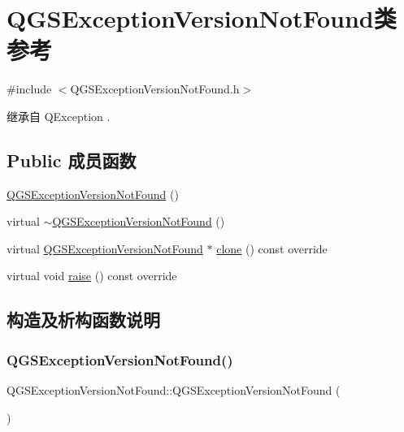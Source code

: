 \hypertarget{class_q_g_s_exception_version_not_found}{}\section{Q\+G\+S\+Exception\+Version\+Not\+Found类 参考}
\label{class_q_g_s_exception_version_not_found}


{\ttfamily \#include $<$Q\+G\+S\+Exception\+Version\+Not\+Found.\+h$>$}



继承自 Q\+Exception .

\subsection*{Public 成员函数}
\begin{DoxyCompactItemize}
\item 
\mbox{\hyperlink{class_q_g_s_exception_version_not_found_a5211acf581c02f697b3f5be156aa3dd7}{Q\+G\+S\+Exception\+Version\+Not\+Found}} ()
\item 
virtual \mbox{\hyperlink{class_q_g_s_exception_version_not_found_ad75a6c5380e7d9b30e19c7618784b5bf}{$\sim$\+Q\+G\+S\+Exception\+Version\+Not\+Found}} ()
\item 
virtual \mbox{\hyperlink{class_q_g_s_exception_version_not_found}{Q\+G\+S\+Exception\+Version\+Not\+Found}} $\ast$ \mbox{\hyperlink{class_q_g_s_exception_version_not_found_ae3c9028ee08276ea656349cd2b220273}{clone}} () const override
\item 
virtual void \mbox{\hyperlink{class_q_g_s_exception_version_not_found_aad639f627b7dce963bbd781f3a755e60}{raise}} () const override
\end{DoxyCompactItemize}


\subsection{构造及析构函数说明}
\mbox{\label{class_q_g_s_exception_version_not_found_a5211acf581c02f697b3f5be156aa3dd7}} 
\subsubsection{\texorpdfstring{Q\+G\+S\+Exception\+Version\+Not\+Found()}{QGSExceptionVersionNotFound()}}
{\footnotesize\ttfamily Q\+G\+S\+Exception\+Version\+Not\+Found\+::\+Q\+G\+S\+Exception\+Version\+Not\+Found (\begin{DoxyParamCaption}{ }\end{DoxyParamCaption})}

